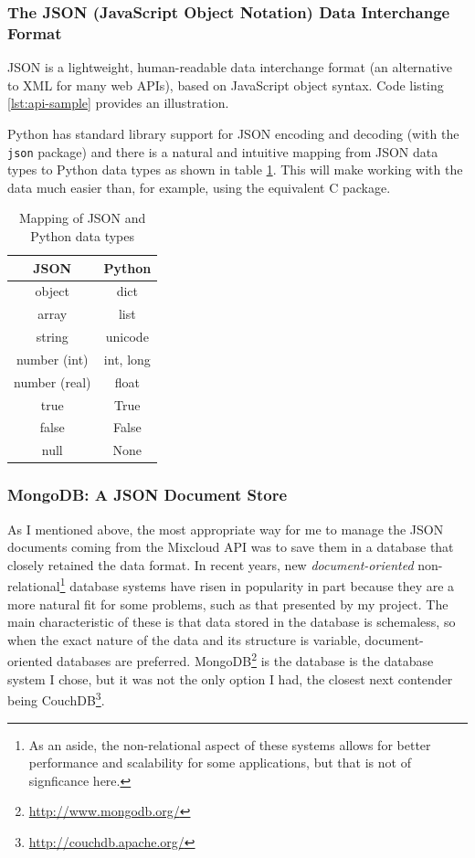 \documentclass[a4paper,12pt,twoside,notitlepage]{report}
\begin{document}
\subsubsection{The JSON (JavaScript Object Notation) Data Interchange Format}

JSON is a lightweight, human-readable data interchange format (an alternative
to XML for many web APIs), based on JavaScript object syntax. Code listing
\ref{lst:api-sample} provides an illustration.

Python has standard library support for JSON encoding and decoding (with the
\texttt{json} package) and there is a natural and intuitive mapping from JSON
data types to Python data types as shown in table \ref{tab:type-mapping}. This
will make working with the data much easier than, for example, using the
equivalent C package.

\begin{table}[h]
  \begin{center}
  \begin{tabular}{>{\ttfamily}c<{\normalfont} | >{\ttfamily}c<{\normalfont}}
\textnormal{JSON} & \textnormal{Python} \\
\hline
object	& dict \\
array	& list \\
string	& unicode \\
number (int)	& int, long  \\
number (real)	& float  \\
true	& True  \\
false	& False  \\
null	& None
  \end{tabular}
  \end{center}
\caption{Mapping of JSON and Python data types}
\label{tab:type-mapping}
\end{table}

\subsubsection{MongoDB: A JSON Document Store} 

As I mentioned above, the most appropriate way for me to manage the JSON
documents coming from the Mixcloud API was to save them in a database
that closely retained the data format. In recent years, new 
\emph{document-oriented} non-relational\footnote{As an aside, the non-relational
aspect of these systems allows for better performance and scalability for some
applications, but that is not of signficance here.} database systems have risen
in popularity in part because they are a more natural fit for some problems,
such as that presented by my project. The main characteristic of these is that
data stored in the database is schemaless, so when the exact nature of the data
and its structure is variable, document-oriented databases are preferred.
MongoDB\footnote{\url{http://www.mongodb.org/}} is the database is the database
system I chose, but it was not the only option I had, the closest next contender
being CouchDB\footnote{\url{http://couchdb.apache.org/}}.
\end{document}
